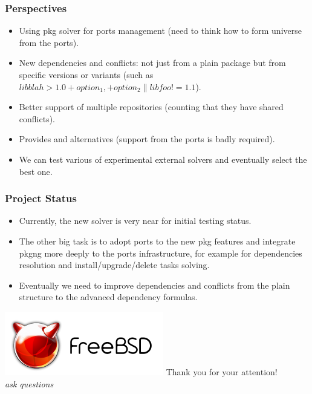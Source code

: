 \documentclass{beamer}
\begin{document}
\begin{frame}
\frametitle{Perspectives}

\begin{itemize}
  \item Using pkg solver for ports management (need to think how to form
  universe from the ports).
  \item New dependencies and conflicts: not just from a plain package but from
  specific versions or variants (such as $libblah > 1.0 +option_1, +option_2 \|
  libfoo != 1.1$).
  \item Better support of multiple repositories (counting that they have shared
  conflicts).
  \item Provides and alternatives (support from the ports is badly required).
  \item We can test various of experimental external solvers and eventually
  select the best one.
\end{itemize}
\end{frame}

\begin{frame}
\frametitle{Project Status}
\begin{itemize}
  \item Currently, the new solver is very near for initial testing status.
  \item The other big task is to adopt ports to the new pkg features and
  integrate pkgng more deeply to the ports infrastructure, for example for dependencies resolution and
install/upgrade/delete tasks solving.
  \item Eventually we need to improve dependencies and conflicts from the plain
  structure to the advanced dependency formulas.
\end{itemize} 
\end{frame}

\begin{frame}
\begin{center}
\includegraphics{logo.pdf}
{\Large Thank you for your attention!} \\
\emph{ask questions}
\end{center}
\end{frame}
\end{document}
